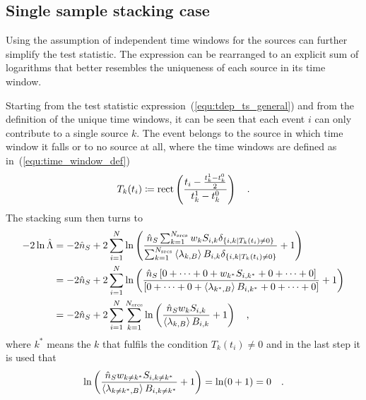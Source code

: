 \subsection{Single sample stacking case}
  \label{chp:pointsource_tdep_llh_single}
Using the assumption of independent time windows for the sources can further simplify the test statistic.
The expression can be rearranged to an explicit sum of logarithms that better resembles the uniqueness of each source in its time window.

Starting from the test statistic expression~(\ref{equ:tdep_ts_general})
and from the definition of the unique time windows, it can be seen that each event $i$ can only contribute to a single source $k$.
The event belongs to the source in which time window it falls or to no source at all, where the time windows are defined as in~(\ref{equ:time_window_def})
\begin{equation}
  T_k(t_i) \coloneqq \operatorname{rect} \left(
    \frac{t_i - \frac{t_k^1-t_k^0}{2}} {t_k^1-t_k^0}
  \right)
  \quad\text{.}
\end{equation}
The stacking sum then turns to
\begin{align}
  -2\ln\hat{\Lambda}
  &= -2\hat{n}_S +
      2\sum_{i=1}^N \ln\left(
        \frac{\hat{n}_S \sum_{k=1}^{N_\text{srcs}} w_k S_{i,k}
              \delta_{\{i,k|T_k(t_i)\neq 0\}}}
             {\sum_{k=1}^{N_\text{srcs}}\Braket{\lambda_{k,B}} B_{i,k}
              \delta_{\{i,k|T_k(t_i)\neq 0\}}}
        + 1
      \right) \\
  &= -2\hat{n}_S +
      2\sum_{i=1}^N \ln\left(
        \frac{\hat{n}_S \left[0+\dots+0+ w_{k^*} S_{i,k^*} +0+\dots+0\right]}
             {\left[
              0+\dots+0+ \Braket{\lambda_{k^*,B}} B_{i,k^*} +0+\dots+0
              \right]}
        + 1
      \right) \\
  &= -2\hat{n}_S +
      2\sum_{i=1}^N \sum_{k=1}^{N_\text{srcs}} \ln\left(
        \frac{\hat{n}_S w_k S_{i,k}}{\Braket{\lambda_{k,B}} B_{i,k}}
        + 1
      \right)
  \quad\text{,}
\end{align}
where $k^*$ means the $k$ that fulfils the condition $T_k(t_i)\neq 0$ and in the last step it is used that
\begin{equation}
  \ln\left(
      \frac{\hat{n}_S w_{k\neq k^*} S_{i,k\neq k^*}}
           {\Braket{\lambda_{k\neq k^*,B}} B_{i,k\neq k^*}}
      + 1
    \right)
    = \ln(0 + 1) = 0
  \quad\text{.}
\end{equation}

